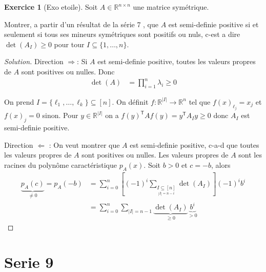 \documentclass[a4paper,12pt,french]{report}
\theoremstyle{plain}
\theoremstyle{definition}
\newtheorem{exercise}{Exercice}[chapter]
\begin{document}
\begin{exercise}[Exo etoile]
Soit $A\in \mathbb{R}^{n\times n}$ une matrice symétrique.

Montrer, a partir d'un résultat de la série 7 \footnotemark{}, que $A$ est semi-definie positive si et seulement si tous ses mineurs symétriques sont positifs ou nuls, c-est a dire $\det(A_{I})\ge0$ pour tour $I\subseteq \{ 1,\dots,n \}$.
\end{exercise}
\begin{proof}[Solution]
Direction $\Rightarrow$: Si $A$ est semi-definie positive, toutes les valeurs propres de $A$ sont positives ou nulles. Donc
\begin{align*}
\det(A) & =\prod_{i=1}^{n} \lambda _{i}\ge 0
\end{align*}

On prend $I=\{ \ell_{1},\dots,\ell _{k} \}\subseteq[n]$. On définit $f:\mathbb{R}^{|I|}\to \mathbb{R}^{n}$ tel que $f(x)_{\ell _{j}}=x_{j}$ et $f(x)_{j}=0$ sinon. Pour $y\in \mathbb{R}^{|I|}$ on a $f(y)^{\mathsf{T}}Af(y)=y^{\mathsf{T}}A_{I}y\ge 0$ donc $A_{I}$ est semi-definie positive.

Direction $\Leftarrow$ : On veut montrer que $A$ est semi-definie positive, c-a-d que toutes les valeurs propres de $A$ sont positives ou nulles. Les valeurs propres de $A$ sont les racines du polynôme caractéristique $p_{A}(x)$. Soit $b>0$ et $c=-b$, alors
\begin{align*}
\underbrace{ p_{A}(c) }_{ \neq 0 }=p_{A}(-b) & =\sum_{i=0}^{n} \left[ (-1)^{i}\sum _{\underset{|I|=n-i}{I\subseteq[n]}} \det(A_{I}) \right] (-1)^{i}b^{i} \\
 & =\sum_{i=0}^{n} \sum _{|I|=n-1}\underbrace{ \det(A_{I}) }_{ \ge 0 }\underbrace{ b^{i} }_{ >0 }
\end{align*}
\end{proof}

\chapter{Serie 9}
\end{document}
